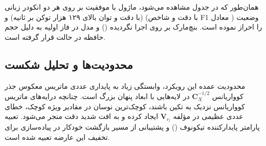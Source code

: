 همان‌طور که در جدول مشاهده می‌شود، ماژول با موفقیت بر روی هر دو انکودر زبانی  (با دقت  و توان بالای ۱۲۹ هزار توکن بر ثانیه) و  (با دقت  و شاخص F1 معادل ) وضعیت  را احراز نموده است. بنچ‌مارک بر روی  اجرا نگردیده () و مدل  در فاز اولیه به دلیل حجم حافظه در حالت  قرار گرفته است.

\subsection{محدودیت‌ها و تحلیل شکست}
محدودیت عمده این رویکرد، وابستگی زیاد به پایداری عددی ماتریس معکوس جذر کوواریانس $\mathbf{C}_X^{-1/2}$ در لایه‌هایی با ابعاد پنهان بزرگ است. چنانچه درایه‌های ماتریس کوواریانس نزدیک به تکین باشند، کوچک‌ترین نوسان در مقادیر ویژه کوچک، خطای عددی عظیمی در مؤلفه $\mathbf{V}_{r_l}$ ایجاد کرده و به افت شدید دقت منجر می‌شود. تعبیه پارامتر پایدارکننده تیکونوف () و پشتیبانی از مسیر بازگشت خودکار در پیاده‌سازی برای تخفیف این عارضه تعبیه شده است.
